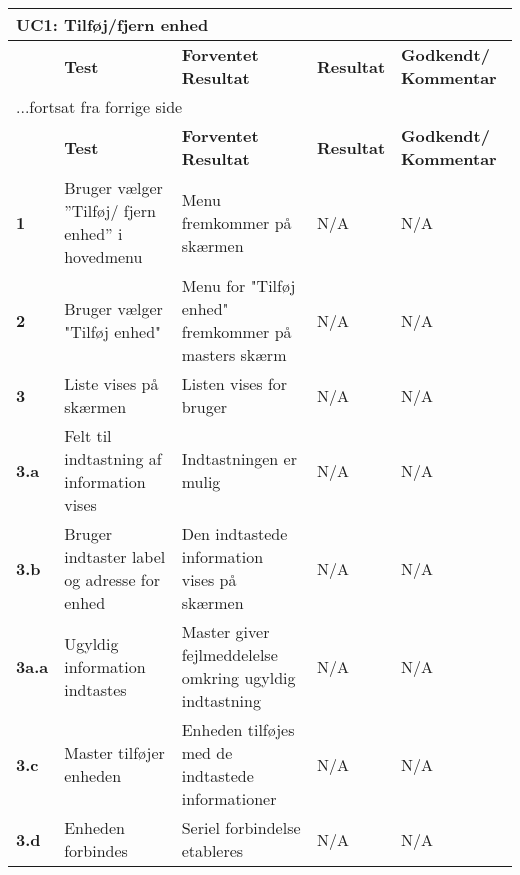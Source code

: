 \begin{center}
\begin{longtable}{|p{}|p{}|p{}|p{}|p{}|} %
\hline
\multicolumn{5}{|l|}{\textbf{UC1: Tilføj/fjern enhed}} \\ \hline
\multicolumn{1}{|c|}{} &
\textbf{Test} &
\textbf{Forventet \newline Resultat} &
\textbf{Resultat} &
\textbf{Godkendt/ \newline Kommentar} \\ \hline 
\endfirsthead

\multicolumn{5}{l}{...fortsat fra forrige side} \\ \hline 
\multicolumn{1}{|c|}{} &
\textbf{Test} &
\textbf{Forventet \newline Resultat} &
\textbf{Resultat} &
\textbf{Godkendt/ \newline Kommentar} \\ \hline 
\endhead


\textbf{1}	&Bruger vælger ''Tilføj/ fjern enhed'' i hovedmenu 
			&Menu fremkommer på skærmen 
			&N/A 
			&N/A \\\hline
			 
\textbf{2}	&Bruger vælger "Tilføj enhed" 
			&Menu for "Tilføj enhed" fremkommer på masters skærm  
			&N/A 
			&N/A \\\hline
			 
\textbf{3}	&Liste vises på skærmen
			&Listen vises for bruger
			&N/A 
			&N/A \\\hline
			 
\textbf{3.a}	&Felt til indtastning af information vises
			&Indtastningen er mulig
			&N/A
			&N/A \\\hline 
			
\textbf{3.b}&Bruger indtaster label og adresse for enhed
			&Den indtastede information vises på skærmen
			&N/A 
			&N/A \\\hline
			
\textbf{3a.a}&Ugyldig information indtastes
			&Master giver fejlmeddelelse omkring ugyldig indtastning
			&N/A 
			&N/A \\\hline
			 
\textbf{3.c}&Master tilføjer enheden
			&Enheden tilføjes med de indtastede informationer
			&N/A 
			&N/A \\\hline
			 
\textbf{3.d}&Enheden forbindes 
			&Seriel forbindelse etableres 
			&N/A
			&N/A \\\hline  
			

\end{longtable}
\end{center}

